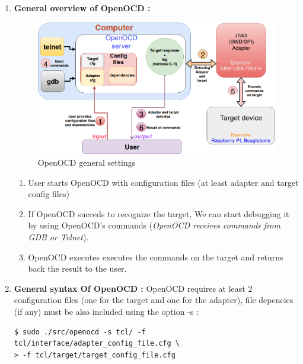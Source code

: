 \begin{enumerate}
	\item \textbf{General overview of OpenOCD : } 
		\begin{figure}[H]
			\centering
        	\includegraphics[scale=0.28]{img/solution/openOCDDiagram.png}
        	\caption{OpenOCD general settings}
        	\label{OpenOCD general settings}
    	\end{figure}
	
		\begin{enumerate}
			\item {User starts OpenOCD with configuration files (at least adapter and target config files)}
			
			\item {If OpenOCD succeds to recognize the target, We can start debugging it by using OpenOCD's commands (\textit{OpenOCD receives commands from GDB or Telnet})}.
			
			\item {OpenOCD executes executes the commands on the target and returns back the result to the user}.
		\end{enumerate}		
	
	\item \textbf{General syntax Of OpenOCD : }	OpenOCD requires at least 2 configuration files (one for the target and one for the adapter), file depencies (if any)  must be also included using the option -s :
	
	\begin{lstlisting}[style=BashInputStyle]	
$ sudo ./src/openocd -s tcl/ -f tcl/interface/adapter_config_file.cfg \ 
> -f tcl/target/target_config_file.cfg	
	\end{lstlisting}
		

\end{enumerate}
